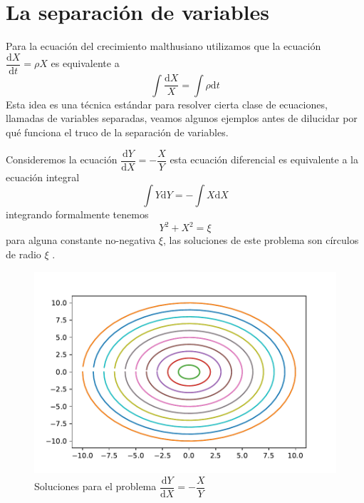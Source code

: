 \section{La separación de variables}

Para la ecuación del crecimiento malthusiano utilizamos que la ecuación $\dfrac{\mathrm{d}X}{\mathrm{d}t}=\rho X$ es equivalente a 
$$\int \dfrac{\mathrm{d}X}{X}=\int \rho\mathrm{d}t$$
Esta idea es una técnica estándar para resolver cierta clase de ecuaciones, llamadas de variables separadas, veamos algunos ejemplos antes de dilucidar por qué funciona el truco de la separación de variables.

\begin{ejemplo}
Consideremos la ecuación $\dfrac{\mathrm{d}Y}{\mathrm{d}X}=-\dfrac{X}{Y}$ esta ecuación diferencial es equivalente a la ecuación integral 
$$
\int Y\mathrm{d}Y =-\int X\mathrm{d}X
$$
integrando formalmente tenemos
$$
Y^2+X^2=\xi
$$
para alguna constante no-negativa $\xi$, las soluciones de este problema son círculos de radio $\xi$ .
\begin{figure}[H]
    \centering
    \includegraphics[scale=0.85]{circulos.pdf}
    \caption{Soluciones para el problema $\dfrac{\mathrm{d}Y}{\mathrm{d}X}=-\dfrac{X}{Y}$ }
    \label{fig:circ}
\end{figure}
\end{ejemplo}


